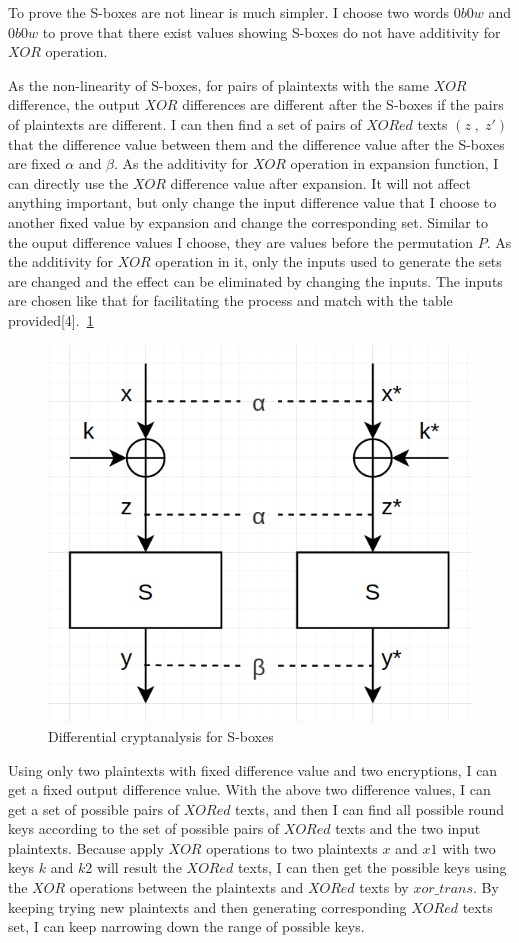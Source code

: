 \documentclass{article}
\begin{document}
To prove the S-boxes are not linear is much simpler. I choose two words $0b0w$ and $0b0w$ to prove that there exist values
showing S-boxes do not have additivity for $XOR$ operation.

As the non-linearity of S-boxes, for pairs of plaintexts with the same $XOR$ difference, the output $XOR$ differences are
different after the S-boxes if the pairs of plaintexts are different. I can then find a set of pairs of $XORed$ texts
$(z\;, \;z')$ that
the difference value between them and the difference value after the S-boxes are fixed $\alpha$ and $\beta$.
As the additivity for $XOR$ operation in expansion function, I can directly use the $XOR$ difference value
after expansion. It will not affect anything important, but only change the input difference value that
I choose to another fixed value by expansion and change the corresponding set. Similar to the ouput difference values I
choose, they are values before the permutation $P$. As the additivity for $XOR$ operation in it, only the inputs used to
generate the sets are changed and the effect can be eliminated by changing the inputs. The inputs are chosen like that
for facilitating the process and match with the table provided[4].~\ref{fig:form6}

\begin{figure}
\centering
\includegraphics[width=0.25\linewidth]{Sboxdc}
\caption{\label{fig:form6} Differential cryptanalysis for S-boxes}
\end{figure}

Using only two plaintexts with fixed difference value and two encryptions, I can get a fixed output difference value.
With the above two difference values, I can get a set of possible pairs of $XORed$ texts, and then I can find all possible
round keys according to the set of possible pairs of $XORed$ texts and the two input plaintexts. Because apply $XOR$
operations to two plaintexts $x$ and $x1$ with two keys $k$ and $k2$ will result the $XORed$ texts, I can then get
the possible keys using the $XOR$ operations between the plaintexts and $XORed$ texts by $xor\_trans$. By keeping
trying new plaintexts and then generating corresponding $XORed$ texts set, I can keep narrowing down the range
of possible keys.
\end{document}
